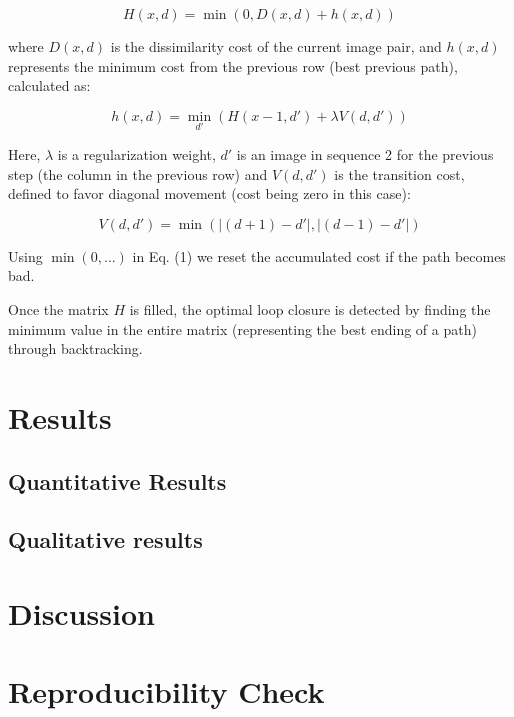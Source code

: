 \documentclass[a4paper]{article}
\begin{document}
\begin{equation}
    H(x,d) = \min(0, D(x,d) + h(x,d))
\end{equation}

where $D(x,d)$ is the dissimilarity cost of the current image pair, and $h(x,d)$ represents the minimum cost from the previous row (best previous path), calculated as:

\begin{equation}
    h(x,d) = \min_{d'} \left( H(x-1, d') + \lambda V(d, d') \right)
\end{equation}

Here, $\lambda$ is a regularization weight, $d'$ is an image in sequence 2 for the previous step (the column in the previous row) and $V(d, d')$ is the transition cost, defined to favor diagonal movement (cost being zero in this case):

\begin{equation}
    V(d, d') = \min(|(d+1) - d'|, |(d-1) - d'|)
\end{equation}

Using $\min(0, \dots)$ in Eq. (1) we reset the accumulated cost if the path becomes bad.

Once the matrix $H$ is filled, the optimal loop closure is detected by finding the minimum value in the entire matrix (representing the best ending of a path) through backtracking.

\section{Results}
\subsection{Quantitative Results}
\subsection{Qualitative results}

\section{Discussion}

\section{Reproducibility Check}



\end{document}
